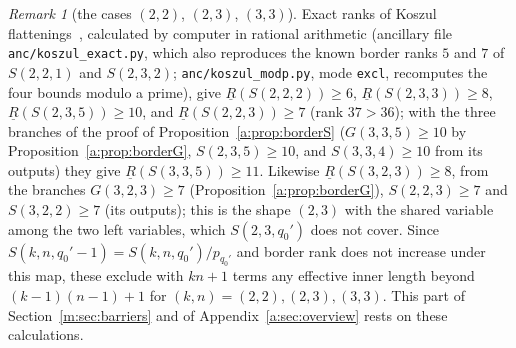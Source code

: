\documentclass[11pt]{article}
\theoremstyle{definition}
\theoremstyle{remark}
\newtheorem{remark}[theorem]{Remark}
\begin{document}
\begin{remark}[the cases $(2,2)$, $(2,3)$, $(3,3)$]\label{a:rem:koszul}
Exact ranks of Koszul flattenings~\cite{LO13}, calculated by computer in rational arithmetic (ancillary file \texttt{anc/koszul\_exact.py}, which also reproduces the known border ranks $5$ and $7$ of $S(2,2,1)$ and $S(2,3,2)$; \texttt{anc/koszul\_modp.py}, mode \texttt{excl}, recomputes the four bounds modulo a prime), give $\underline R(S(2,2,2))\ge6$, $\underline R(S(2,3,3))\ge8$, $\underline R(S(2,3,5))\ge10$, and $\underline R(S(2,2,3))\ge7$ (rank $37>36$); with the three branches of the proof of Proposition~\ref{a:prop:borderS} ($G(3,3,5)\ge10$ by Proposition~\ref{a:prop:borderG}, $S(2,3,5)\ge10$, and $S(3,3,4)\ge10$ from its outputs) they give $\underline R(S(3,3,5))\ge11$. Likewise $\underline R(S(3,2,3))\ge8$, from the branches $G(3,2,3)\ge7$ (Proposition~\ref{a:prop:borderG}), $S(2,2,3)\ge7$ and $S(3,2,2)\ge7$ (its outputs); this is the shape $(2,3)$ with the shared variable among the two left variables, which $S(2,3,q_0')$ does not cover. Since $S(k,n,q_0'-1)=S(k,n,q_0')/p_{q_0'}$ and border rank does not increase under this map, these exclude with $kn+1$ terms any effective inner length beyond $(k-1)(n-1)+1$ for $(k,n)=(2,2),(2,3),(3,3)$. This part of Section~\ref{m:sec:barriers} and of Appendix~\ref{a:sec:overview} rests on these calculations.
\end{remark}
\end{document}
